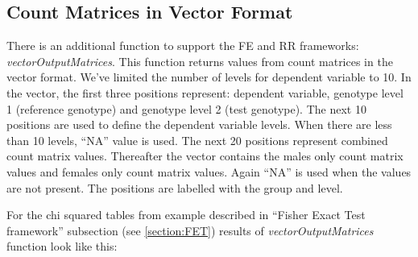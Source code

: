 \documentclass[12pt,a4paper]{article}
\begin{document}
\subsection{Count Matrices in Vector Format}
There is an additional function to support the FE and RR frameworks: \textit{vectorOutputMatrices}. This function returns values from count matrices in the vector format.
We've limited the number of levels for dependent variable to 10. 
In the vector, the first three positions represent: dependent variable, genotype level 1 (reference genotype) and genotype level 2 (test genotype).
The next 10 positions are used to define the dependent variable levels. When there are less than 10 levels, ``NA'' value is used.
The next 20 positions represent combined count matrix values. Thereafter the vector contains the males only count matrix values and females only count matrix values. Again ``NA'' is used when the values are not present. The positions are labelled with the group and level.

For the chi squared tables from example described in ``Fisher Exact Test framework'' subsection (see \ref{section:FET}) results of \textit{vectorOutputMatrices} function look like this:
\end{document}
